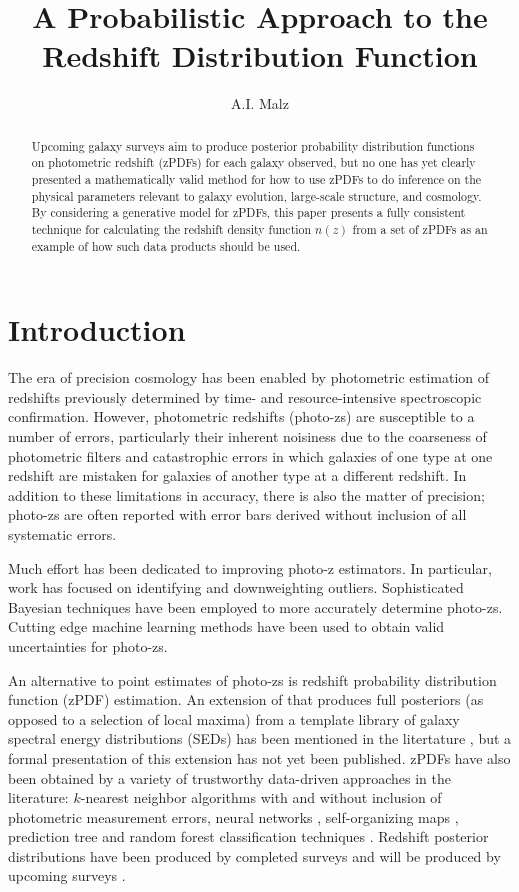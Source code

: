 \documentclass[preprint]{aastex}
\begin{document}
\title{A Probabilistic Approach to the Redshift Distribution Function}

\author{A.I. Malz}

\begin{abstract}
Upcoming galaxy surveys aim to produce posterior probability distribution functions on photometric redshift (zPDFs) for each galaxy observed, but no one has yet clearly presented a mathematically valid method for how to use zPDFs to do inference on the physical parameters relevant to galaxy evolution, large-scale structure, and cosmology.  By considering a generative model for zPDFs, this paper presents a fully consistent technique for calculating the redshift density function $n(z)$ from a set of zPDFs as an example of how such data products should be used.  
\end{abstract}


\section{Introduction}
\label{sec:intro}

The era of precision cosmology has been enabled by photometric estimation of redshifts previously determined by time- and resource-intensive spectroscopic confirmation.  However, photometric redshifts (photo-zs) are susceptible to a number of errors, particularly their inherent noisiness due to the coarseness of photometric filters and catastrophic errors in which galaxies of one type at one redshift are mistaken for galaxies of another type at a different redshift.  In addition to these limitations in accuracy, there is also the matter of precision; photo-zs are often reported with error bars derived without inclusion of all systematic errors.

Much effort has been dedicated to improving photo-z estimators.  \citep{bud08}  In particular, work has focused on identifying and downweighting outliers.  \citep{gor13}  Sophisticated Bayesian techniques have been employed to more accurately determine photo-zs.  \citep{sad15}  Cutting edge machine learning methods have been used to obtain valid uncertainties for photo-zs.  \citep{car10}

An alternative to point estimates of photo-zs is redshift probability distribution function (zPDF) estimation.  An extension of \citet{ben00} that produces full posteriors (as opposed to a selection of local maxima) from a template library of galaxy spectral energy distributions (SEDs) has been mentioned in the litertature \citep{hil11, kel12, lop14}, but a formal presentation of this extension has not yet been published.  zPDFs have also been obtained by a variety of trustworthy data-driven approaches in the literature: $k$-nearest neighbor algorithms with \citep{bal08} and without \citep{she11} inclusion of photometric measurement errors, neural networks \citep{bon13}, self-organizing maps \citep{car14}, prediction tree and random forest classification techniques \citep{car10, car13}.  Redshift posterior distributions have been produced by completed surveys \citep{hil11, she11} and will be produced by upcoming surveys \citep{abe09, car14}.
\end{document}
